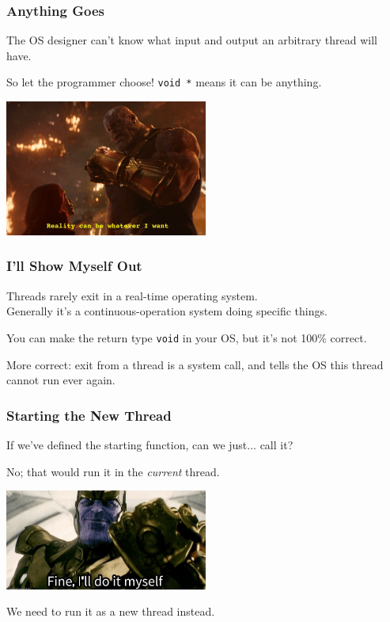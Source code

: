\begin{frame}
\frametitle{Anything Goes}

The OS designer can't know what input and output an arbitrary thread will have.

So let the programmer choose! \texttt{void *} means it can be anything.

\begin{center}
	\includegraphics[width=0.5\textwidth]{images/reality.png}
\end{center}

\end{frame}


\begin{frame}
\frametitle{I'll Show Myself Out}

Threads rarely exit in a real-time operating system.\\
\quad Generally it's a continuous-operation system doing specific things.


You can make the return type \texttt{void} in your OS, but it's not 100\% correct.

More correct: exit from a thread is a system call, and tells the OS this thread cannot run ever again.

\end{frame}



\begin{frame}
\frametitle{Starting the New Thread}

If we've defined the starting function, can we just... call it?

No; that would run it in the \textit{current} thread.

\begin{center}
	\includegraphics[width=0.5\textwidth]{images/doitmyself.png}
\end{center}

We need to run it as a new thread instead. 

\end{frame}


